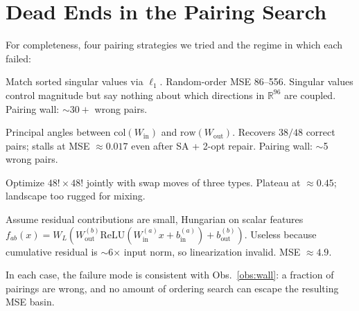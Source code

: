 \documentclass[10pt]{article}
\theoremstyle{remark}
\begin{document}
\section{Dead Ends in the Pairing Search}
\label{app:deadends}

For completeness, four pairing strategies we tried and the regime in
which each failed:

\begin{description}[leftmargin=*]
  \item[SV-L1 spectrum.] Match sorted singular values via $\ell_1$.
        Random-order MSE 86--556. Singular values control magnitude
        but say nothing about which directions in $\mathbb{R}^{96}$
        are coupled. Pairing wall: $\sim 30+$ wrong pairs.
  \item[Subspace overlap.] Principal angles between
        $\mathrm{col}(W_{\mathrm{in}})$ and $\mathrm{row}(W_{\mathrm{out}})$.
        Recovers $38/48$ correct pairs; stalls at MSE $\approx 0.017$
        even after SA + 2-opt repair. Pairing wall: $\sim$5 wrong pairs.
  \item[Joint SA over (pairing, ordering).] Optimize $48!\times 48!$
        jointly with swap moves of three types. Plateau at
        $\approx 0.45$; landscape too rugged for mixing.
  \item[First-order algebraic.] Assume residual contributions are
        small, Hungarian on scalar features
        $f_{ab}(x) = W_L (W_{\mathrm{out}}^{(b)} \mathrm{ReLU}(W_{\mathrm{in}}^{(a)} x + b_{\mathrm{in}}^{(a)}) + b_{\mathrm{out}}^{(b)})$.
        Useless because cumulative residual is $\sim$6$\times$ input
        norm, so linearization invalid. MSE $\approx 4.9$.
\end{description}

In each case, the failure mode is consistent with Obs.~\ref{obs:wall}:
a fraction of pairings are wrong, and no amount of ordering search can
escape the resulting MSE basin.
\end{document}
